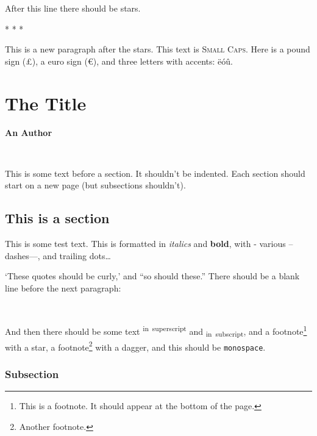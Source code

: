 \documentclass[
  12pt,
  a4paper,
]{article}
\begin{document}
After this line there should be stars.

\begin{center}* * *\end{center}

\makeatletter
\@afterindentfalse
\@afterheading
\makeatother

This is a new paragraph after the stars. This text is \textsc{Small
Caps}. Here is a pound sign (£), a euro sign (€), and three letters with
accents: ëóû.

\hypertarget{__h1_2}{%
\section{The Title}\label{__h1_2}}

\makeatletter
\@afterindentfalse
\@afterheading
\makeatother

\textbf{An Author}

~

\makeatletter
\@afterindentfalse
\@afterheading
\makeatother

This is some text before a section. It shouldn't be indented. Each
section should start on a new page (but subsections shouldn't).

\hypertarget{__h2_2}{%
\subsection{This is a section}\label{__h2_2}}

\makeatletter
\@afterindentfalse
\@afterheading
\makeatother

This is some test text. This is formatted in \emph{italics} and
\textbf{bold}, with - various -- dashes---, and trailing dots\ldots{}

`These quotes should be curly,' and ``so should these.'' There should be
a blank line before the next paragraph:

~

\makeatletter
\@afterindentfalse
\@afterheading
\makeatother

And then there should be some text \textsuperscript{in~superscript} and
\textsubscript{in~subscript}, and a footnote\footnote{This is a
  footnote. It should appear at the bottom of the page.} with a star, a
footnote\footnote{Another footnote.} with a dagger, and this should be
\texttt{monospace}.

\hypertarget{__h3_2}{%
\subsubsection{Subsection}\label{__h3_2}}
\end{document}
